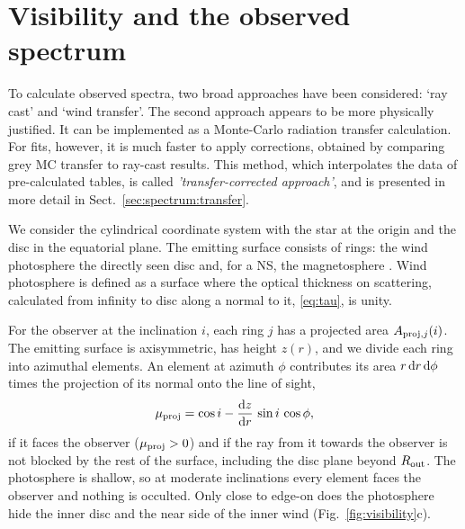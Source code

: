 
\section{Visibility and the observed spectrum}
\label{sec:spectrum}
To calculate observed spectra, two broad approaches have been considered: `ray cast' and `wind transfer'.
The second approach appears to be more physically justified.
It can be implemented as a Monte-Carlo radiation transfer calculation.  For fits, however, it is much faster to apply corrections, obtained by comparing grey MC transfer to ray-cast  results. This method, which interpolates the data of pre-calculated tables,  is called \textit{'transfer-corrected approach'}, and is presented in more detail in Sect.~\ref{sec:spectrum:transfer}.

We consider the cylindrical coordinate system with the star at the origin and the disc in the equatorial plane. 
The emitting surface consists of rings: the wind photosphere
the directly seen disc and, for a NS, the magnetosphere .
Wind photosphere is defined as a surface where the optical thickness on scattering, calculated from infinity to disc along a normal to it, \eqref{eq:tau}, is unity.

For the observer at the inclination $i$, each ring $j$ has a projected area $A_{{\rm proj},j}(i)$.
The emitting surface is axisymmetric, has height $z(r)$, and we divide each ring into  azimuthal elements.
An element at azimuth $\phi$ contributes its area $r\,{\rm d}r\,{\rm d}\phi$ times the projection of its normal onto the line of sight,
\begin{equation}
\mu_{\rm proj} = \cos i - \frac{{\rm d}z}{{\rm d}r}\,\sin i\,\cos\phi ,
\label{eq:muproj}
\end{equation}
if it faces the observer ($\mu_{\rm proj} > 0$) and if the ray from it towards the observer is not blocked by the rest of the surface, including the disc plane beyond $R_{\rm out}$.
{The photosphere is shallow, so at moderate inclinations every element faces the observer and nothing is occulted.
Only close to edge-on does the photosphere hide the inner disc and the near side of the inner wind (Fig.~\ref{fig:visibility}c).}

